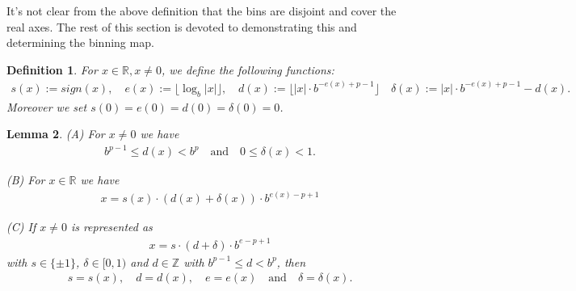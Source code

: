 \documentclass{article}
\theoremstyle{plain}
\newtheorem{definition}{Definition}[section]
\newtheorem{lemma}[definition]{Lemma}
\theoremstyle{remark}
\newcommand{\IR}{\mathbb{R}}
\newcommand{\IZ}{\mathbb{Z}}
\newcommand{\qtext}[1]{\quad\text{#1}\quad} %
\newcommand{\floor}[1]{\lfloor#1\rfloor}
\newcommand{\abs}[1]{|#1|}
\begin{document}
It's not clear from the above definition that the bins are disjoint and cover the real axes.
The rest of this section is devoted to demonstrating this and determining the binning map.

\begin{definition}
  For $x\in\IR, x\neq 0$, we define the following functions:
  \begin{align*}
    s(x) := sign(x), \quad
    e(x) := \floor{\log_b\abs{x}}, \quad
    d(x) := \floor{\abs{x} \cdot b^{-e(x)+p-1}} \quad
    \delta(x) := \abs{x} \cdot b^{-e(x)+p-1} - d(x).
  \end{align*}
  Moreover we set $s(0) = e(0) = d(0) = \delta(0) = 0$.
\end{definition}

\begin{lemma} \label{floatlem}
  (A) For $x \neq 0$ we have
  \begin{align*}
    b^{p-1} \leq d(x) < b^p \qtext{and} 0 \leq \delta(x) < 1.
  \end{align*}

  (B) For $x \in \IR$ we have
  \begin{align*}
    x = s(x) \cdot (d(x) + \delta(x)) \cdot b^{e(x) - p + 1}
  \end{align*}

  (C) If $x \neq 0$ is represented as
  \begin{align*}
    x = s \cdot (d + \delta) \cdot b^{e - p + 1}
  \end{align*}
  with $s \in \{\pm 1\}$, $\delta \in [0,1)$ and $d \in \IZ$ with $b^{p-1} \leq d < b^p$, then
  \begin{align*}
    s = s(x), \quad d = d(x), \quad e = e(x) \qtext{and} \delta = \delta(x).
  \end{align*}
\end{lemma}
\end{document}
